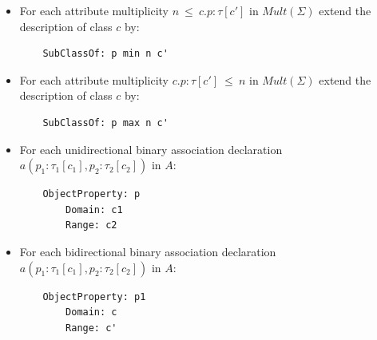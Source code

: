 \documentclass[10pt,fleqn,final]{scrreprt}
\newenvironment{definitions}[0]{\medskip }{}
\begin{document}
\begin{definitions}
\begin{itemize}
\item For each attribute multiplicity $n\ \mathsf{\leq}\ c.p:\tau[c']$ in $\mathit{Mult}(\Sigma)$ extend the description of class $c$ by:
\begin{lstlisting}
	SubClassOf: p min n c'
\end{lstlisting}

\item For each attribute multiplicity $ c.p:\tau[c'] \ \mathsf{\leq}\ n$  in $\mathit{Mult}(\Sigma)$ extend the description of class $c$ by:
\begin{lstlisting}
	SubClassOf: p max n c'
\end{lstlisting}

\item For each unidirectional binary association declaration $a(p_1:\tau_1[c_1],p_2:\tau_2[c_2])$ in $A$:
\begin{lstlisting}
	ObjectProperty: p
		Domain: c1
		Range: c2
\end{lstlisting}
\item For each bidirectional binary association declaration $a(p_1:\tau_1[c_1],p_2:\tau_2[c_2])$ in $A$:
\begin{lstlisting}
	ObjectProperty: p1
		Domain: c
		Range: c'


\end{lstlisting}
\end{itemize}
\end{definitions}
\end{document}
